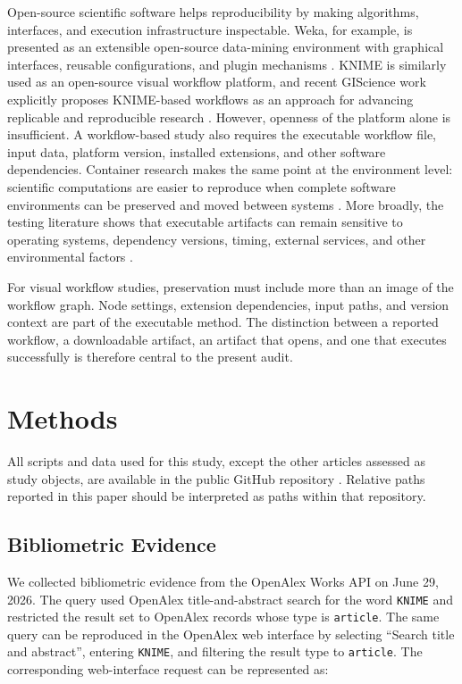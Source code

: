 \documentclass[runningheads]{llncs}
\begin{document}
Open-source scientific software helps reproducibility by making algorithms,
interfaces, and execution infrastructure inspectable. Weka, for example, is
presented as an extensible open-source data-mining environment with graphical
interfaces, reusable configurations, and plugin mechanisms
\cite{Hall2009WEKA}. KNIME is similarly used as an open-source visual workflow
platform, and recent GIScience work explicitly proposes KNIME-based workflows
as an approach for advancing replicable and reproducible research
\cite{Fu2025GIScienceKNIME}. However, openness of the platform alone is
insufficient. A workflow-based study also requires the executable workflow
file, input data, platform version, installed extensions, and other software
dependencies. Container research makes the same point at the environment
level: scientific computations are easier to reproduce when complete software
environments can be preserved and moved between systems
\cite{Kurtzer2017Singularity}. More broadly, the testing literature shows that
executable artifacts can remain sensitive to operating systems, dependency
versions, timing, external services, and other environmental factors
\cite{Rasheed2023FlakinessReview}.

For visual workflow studies, preservation must include more than an image of
the workflow graph. Node settings, extension dependencies, input paths, and
version context are part of the executable method. The distinction between a
reported workflow, a downloadable artifact, an artifact that opens, and one
that executes successfully is therefore central to the present audit.

\section{Methods}

All scripts and data used for this study, except the other articles assessed
as study objects, are available in the public GitHub repository
\cite{KaplanReproducibilityRisksArticle2026}. Relative paths reported in this
paper should be interpreted as paths within that repository.

\subsection{Bibliometric Evidence}

We collected bibliometric evidence from the OpenAlex Works API
\cite{Priem2022OpenAlex} on June 29, 2026. The query used OpenAlex
title-and-abstract search for the word \texttt{KNIME} and restricted the
result set to OpenAlex records whose type is \texttt{article}. The same query
can be reproduced in the
OpenAlex web interface by selecting ``Search title and abstract'', entering
\texttt{KNIME}, and filtering the result type to \texttt{article}. The
corresponding web-interface request can be represented as:
\end{document}
